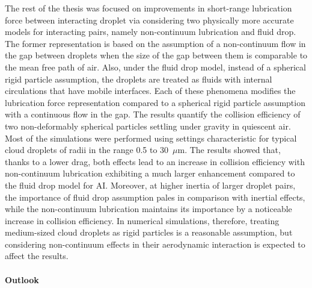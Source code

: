 \documentclass[../thesis.tex]{subfiles}
\begin{document}
The rest of the thesis was focused on improvements in short-range lubrication force between interacting droplet via considering two physically more accurate models for interacting pairs, namely non-continuum lubrication and fluid drop. The former representation is based on the assumption of a non-continuum flow in the gap between droplets when the size of the gap between them is comparable to the mean free path of air. Also, under the fluid drop model, instead of a spherical rigid particle assumption, the droplets are treated as fluids with internal circulations that have mobile interfaces. Each of these phenomena modifies the lubrication force representation compared to a spherical rigid particle assumption with a continuous flow in the gap. The results quantify the collision efficiency of two non-deformably spherical particles settling under gravity in quiescent air. Most of the simulations were performed using settings characteristic for typical cloud droplets of radii in the range 0.5 to 30~$\mu$m. The results showed that, thanks to a lower drag, both effects lead to an increase in collision efficiency with non-continuum lubrication exhibiting a much larger enhancement compared to the fluid drop model for AI. Moreover, at higher inertia of larger droplet pairs, the importance of fluid drop assumption pales in comparison with inertial effects, while the non-continuum lubrication maintains its importance by a noticeable increase in collision efficiency. In numerical simulations, therefore, treating medium-sized cloud droplets as rigid particles is a reasonable assumption, but considering non-continuum effects in their aerodynamic interaction is expected to affect the results. 

\paragraph{Outlook}
\end{document}
